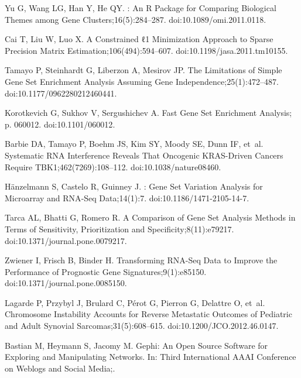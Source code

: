 \documentclass[10pt,letterpaper]{article}
\begin{document}
\begin{thebibliography}{10}
	Yu G, Wang LG, Han Y, He QY.
	: An {{R}} Package for Comparing Biological Themes
	among Gene Clusters;16(5):284--287.
	\newblock doi:{10.1089/omi.2011.0118}.
	
	Cai T, Liu W, Luo X.
	\newblock A {{Constrained}} ℓ1 {{Minimization Approach}} to {{Sparse
			Precision Matrix Estimation}};106(494):594--607.
	\newblock doi:{10.1198/jasa.2011.tm10155}.
	
	Tamayo P, Steinhardt G, Liberzon A, Mesirov JP.
	\newblock The {{Limitations}} of {{Simple Gene Set Enrichment Analysis Assuming
			Gene Independence}};25(1):472--487.
	\newblock doi:{10.1177/0962280212460441}.
	
	Korotkevich G, Sukhov V, Sergushichev A.
	\newblock Fast Gene Set Enrichment Analysis; p. 060012.
	\newblock doi:{10.1101/060012}.
	
	Barbie DA, Tamayo P, Boehm JS, Kim SY, Moody SE, Dunn IF, et~al.
	\newblock Systematic {{RNA}} Interference Reveals That Oncogenic
	{{KRAS}}-Driven Cancers Require {{TBK1}};462(7269):108--112.
	\newblock doi:{10.1038/nature08460}.
	
	Hänzelmann S, Castelo R, Guinney J.
	: Gene Set Variation Analysis for Microarray and
	{{RNA}}-{{Seq}} Data;14(1):7.
	\newblock doi:{10.1186/1471-2105-14-7}.
	
	Tarca AL, Bhatti G, Romero R.
	\newblock A {{Comparison}} of {{Gene Set Analysis Methods}} in {{Terms}} of
	{{Sensitivity}}, {{Prioritization}} and {{Specificity}};8(11):e79217.
	\newblock doi:{10.1371/journal.pone.0079217}.
	
	Zwiener I, Frisch B, Binder H.
	\newblock Transforming {{RNA}}-{{Seq Data}} to {{Improve}} the {{Performance}}
	of {{Prognostic Gene Signatures}};9(1):e85150.
	\newblock doi:{10.1371/journal.pone.0085150}.
	
	Lagarde P, Przybyl J, Brulard C, Pérot G, Pierron G, Delattre O, et~al.
	\newblock Chromosome Instability Accounts for Reverse Metastatic Outcomes of
	Pediatric and Adult Synovial Sarcomas;31(5):608--615.
	\newblock doi:{10.1200/JCO.2012.46.0147}.
	
	Bastian M, Heymann S, Jacomy M.
	\newblock Gephi: An Open Source Software for Exploring and Manipulating
	Networks.
	\newblock In: Third International {{AAAI}} Conference on Weblogs and Social
	Media;.
	

\end{thebibliography}
\end{document}
